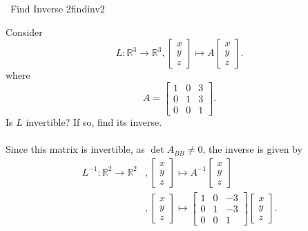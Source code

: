         \pagebreak
        \begin{example}{\Difficulty\,\Difficulty\,\,Find Inverse 2}{findinv2}

            Consider
            \begin{equation*}
                L:\mathbb{R}^3\to\mathbb{R}^3,\begin{bmatrix} x \\ y \\ z \end{bmatrix}\mapsto A\begin{bmatrix} x \\ y \\ z \end{bmatrix}.
            \end{equation*}
            where
            \begin{equation*}
                A=\begin{bmatrix}
                    1 & 0 & 3 \\
                    0 & 1 & 3 \\
                    0 & 0 & 1
                \end{bmatrix}.
            \end{equation*}
            Is \(L\) invertible? If so, find its inverse.
            \\
            \\
            Since this matrix is invertible, as \(\det A_{BB}\neq 0\), the inverse is given by
            \begin{align*}
                L^{-1}:\mathbb{R}^2\to\mathbb{R}^2&,\begin{bmatrix} x \\ y \\ z \end{bmatrix}\mapsto A^{-1}\begin{bmatrix} x \\ y  \\ z \end{bmatrix} \\
                &,\begin{bmatrix} x \\ y \\ z \end{bmatrix}\mapsto \begin{bmatrix} 1 & 0 & -3 \\ 0 & 1 & -3 \\ 0 & 0 & 1 \end{bmatrix}\begin{bmatrix} x \\ y \\ z \end{bmatrix}.
            \end{align*}
        \end{example}
